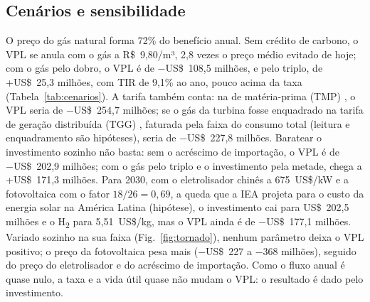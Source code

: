 \documentclass[10pt,a4paper,twocolumn]{article}
\newcommand{\Ht}{H\textsubscript{2}}
\begin{document}
\subsection{Cenários e sensibilidade}

O preço do gás natural forma 72\% do benefício anual. Sem crédito de carbono, o VPL se anula com o gás a R\$~9,80/m³, 2,8 vezes o preço médio evitado de hoje; com o gás pelo dobro, o VPL é de −US\$~108,5 milhões, e pelo triplo, de +US\$~25,3 milhões, com TIR de 9,1\% ao ano, pouco acima da taxa (Tabela~\ref{tab:cenarios}). A tarifa também conta: na de matéria-prima (TMP) \cite{scgas2026b}, o VPL seria de −US\$~254,7 milhões; se o gás da turbina fosse enquadrado na tarifa de geração distribuída (TGG) \cite{scgas2026c}, faturada pela faixa do consumo total (leitura e enquadramento são hipóteses), seria de −US\$~227,8 milhões. Baratear o investimento sozinho não basta: sem o acréscimo de importação, o VPL é de −US\$~202,9 milhões; com o gás pelo triplo e o investimento pela metade, chega a +US\$~171,3 milhões. Para 2030, com o eletrolisador chinês a 675~US\$/kW e a fotovoltaica com o fator $18/26 = 0{,}69$, a queda que a IEA projeta para o custo da energia solar na América Latina \cite{iea2025b} (hipótese), o investimento cai para US\$~202,5 milhões e o \Ht{} para 5,51~US\$/kg, mas o VPL ainda é de −US\$~177,1 milhões. Variado sozinho na sua faixa (Fig.~\ref{fig:tornado}), nenhum parâmetro deixa o VPL positivo; o preço da fotovoltaica pesa mais (−US\$~227 a −368 milhões), seguido do preço do eletrolisador e do acréscimo de importação. Como o fluxo anual é quase nulo, a taxa e a vida útil quase não mudam o VPL: o resultado é dado pelo investimento.
\end{document}
